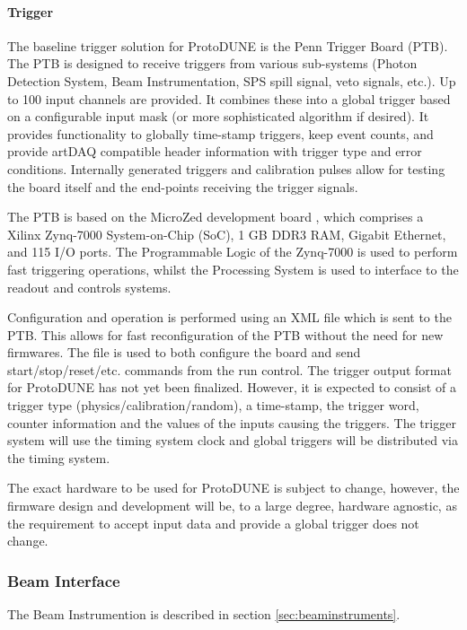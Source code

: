\paragraph{Trigger}

The baseline trigger solution for ProtoDUNE is the Penn Trigger Board
(PTB). The PTB is designed to receive triggers from various sub-systems
(Photon Detection System, Beam Instrumentation, SPS spill signal, veto
signals, etc.).  Up to 100 input channels are provided.  It combines
these into a global trigger based on a configurable input mask (or
more sophisticated algorithm if desired).  It provides functionality
to globally time-stamp triggers, keep event counts, and provide artDAQ
compatible header information with trigger type and error conditions.
Internally generated triggers and calibration pulses allow for testing
the board itself and the end-points receiving the trigger signals.

The PTB is based on the MicroZed development board \cite{avnet:microzed}, which comprises a
Xilinx Zynq-7000 System-on-Chip (SoC), 1 GB DDR3 RAM, Gigabit Ethernet,
and 115 I/O ports.  The Programmable Logic of the Zynq-7000 is used to
perform fast triggering operations, whilst the Processing System is used
to interface to the readout and controls systems.

Configuration and operation is performed using an XML file which is sent
to the PTB.  This allows for fast reconfiguration of the PTB without
the need for new firmwares.  The file is used to both configure the board
and send start/stop/reset/etc. commands from the run control.
The trigger output format for ProtoDUNE has not yet been finalized.  
However, it is expected to consist of a trigger type (physics/calibration/random),
a time-stamp, the trigger word, counter information and the values 
of the inputs causing the triggers.  
The trigger system will use the timing system clock and global triggers will be
distributed via the timing system.  

The exact hardware to be used for ProtoDUNE is subject to change, 
however, the firmware design and development will be, to a large degree, hardware
agnostic, as the requirement to accept input data and provide a global trigger 
does not change.  

\subsubsection{Beam Interface}

The Beam Instrumention is described in section \ref{sec:beaminstruments}.

